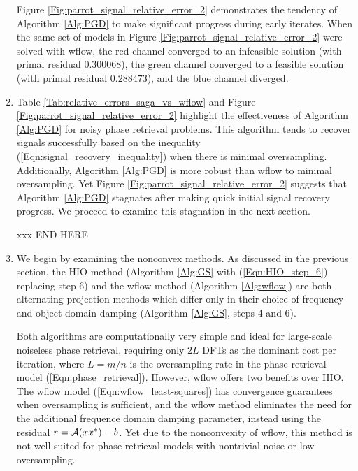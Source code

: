 \begin{enumerate}
Figure \ref{Fig:parrot_signal_relative_error_2} demonstrates the tendency of Algorithm \ref{Alg:PGD} to make significant progress during early iterates.  When the same set of models in Figure \ref{Fig:parrot_signal_relative_error_2} were solved with wflow, the red channel converged to an infeasible solution (with primal residual $0.300068$), the green channel converged to a feasible solution (with primal residual $0.288473$), and the blue channel diverged.  




\item

Table \ref{Tab:relative_errors_saga_vs_wflow} and Figure \ref{Fig:parrot_signal_relative_error_2} highlight the effectiveness of Algorithm \ref{Alg:PGD} for noisy phase retrieval problems.  This algorithm tends to recover signals successfully based on the inequality (\ref{Eqn:signal_recovery_inequality}) when there is minimal oversampling.  Additionally, Algorithm \ref{Alg:PGD} is more robust than wflow to minimal oversampling.  Yet Figure \ref{Fig:parrot_signal_relative_error_2} suggests that Algorithm \ref{Alg:PGD} stagnates after making quick initial signal recovery progress.  We proceed to examine this stagnation in the next section.


xxx END HERE



\item

We begin by examining the nonconvex methods.  As discussed in the previous section, the HIO method  (Algorithm \ref{Alg:GS} with (\ref{Eqn:HIO_step_6}) replacing step 6) and the wflow method (Algorithm \ref{Alg:wflow}) are both alternating projection methods which differ only in their choice of frequency and object domain damping (Algorithm \ref{Alg:GS}, steps 4 and 6).  

Both algorithms are computationally very simple and ideal for large-scale noiseless phase retrieval, requiring only $2L$ DFTs as the dominant cost per iteration, where $L=m/n$ is the oversampling rate in the phase retrieval model (\ref{Eqn:phase_retrieval}).  However, wflow offers two benefits over HIO.  The wflow model (\ref{Eqn:wflow_least-squares}) has convergence guarantees when oversampling is sufficient, and the wflow method eliminates the need for the additional frequence domain damping parameter, instead using the residual $r = {\mathcal A}(xx^*) - b$.  Yet due to the nonconvexity of wflow, this method is not well suited for phase retrieval models with nontrivial noise or low oversampling.




\end{enumerate}
